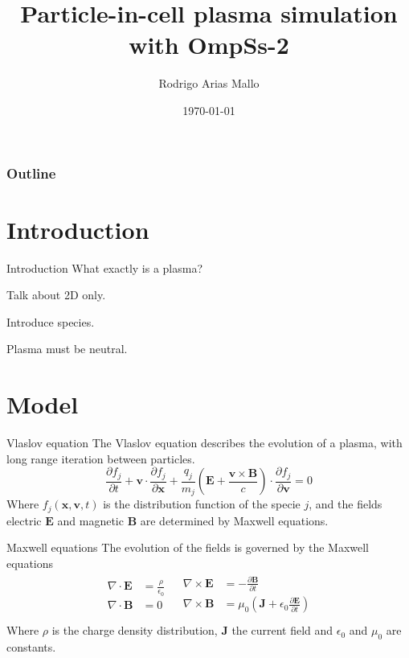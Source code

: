 \documentclass{beamer}
\title{Particle-in-cell plasma simulation with OmpSs-2}
\author{Rodrigo Arias Mallo}
\date{\today}
\newcommand*\V[1]{\bm{#1}}
\newcommand{\E}{\V{E}}
\newcommand{\B}{\V{B}}
\renewcommand*{\v}{\V{v}}
\newcommand{\x}{\V{x}}
\begin{document}
\frame{\titlepage}

\begin{frame}
\frametitle{Outline}
\tableofcontents
\end{frame}

\section{Introduction}

\begin{frame}{Introduction}
What exactly is a plasma?

Talk about 2D only.

Introduce species.

Plasma must be neutral.

\end{frame}

\section{Model}

\begin{frame}{Vlaslov equation}
The Vlaslov equation describes the evolution of a plasma, with long range 
iteration between particles.
\begin{equation}
\frac {\partial f_j}{\partial t} +
\v \cdot \frac {\partial f_j}{\partial \V x } +
\frac{q_j}{m_j} \left( \E + \frac{\v \times \B}{c} \right) \cdot
	\frac {\partial f_j}{\partial \V v}
=0
\end{equation}
Where $f_j(\x,\v,t)$ is the distribution function of the specie $j$, and the 
fields electric $\E$ and magnetic $\B$ are determined by Maxwell equations.
\end{frame}

\begin{frame}{Maxwell equations}{}
The evolution of the fields is governed by the Maxwell equations
\small
\begin{align}
\begin{split}
\nabla \cdot \E &= \frac {\rho }{\epsilon_0} \\
\nabla \cdot \B &= 0 \\
\end{split}
&
\begin{split}
\nabla \times \E &= - \frac {\partial \B }{\partial t} \\
\nabla \times \B &= \mu_0 \left(\V J +
	\epsilon_0 \frac{\partial \E}{\partial t}\right) \\
\end{split}
\end{align}
%
\normalsize
Where $\rho$ is the charge density distribution, $\V J$ the current field and
$\epsilon_0$ and $\mu_0$ are constants.

\end{frame}
\end{document}
